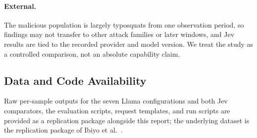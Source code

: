 \paragraph{External.} The malicious population is largely typosquats from
one observation period, so findings may not transfer to other attack
families or later windows, and Jev results are tied to the recorded
provider and model version. We treat the study as a controlled comparison,
not an absolute capability claim.

\subsection{Data and Code Availability}
\label{sec:avail}

Raw per-sample outputs for the seven Llama configurations and both Jev
comparators, the evaluation scripts, request templates, and run scripts are
provided as a replication package alongside this report; the underlying dataset is the replication package of
Ibiyo et al.~\cite{ease2025rag}.
\endinput
